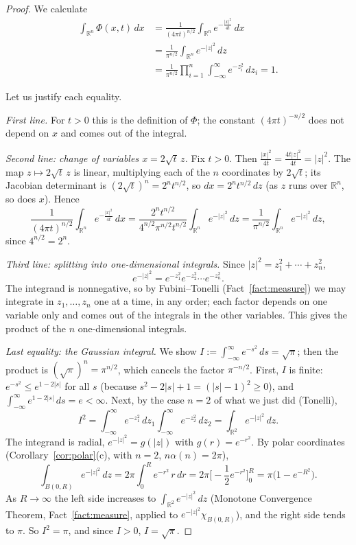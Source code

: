 \documentclass[11pt]{article}
\theoremstyle{plain}
\theoremstyle{definition}
\theoremstyle{remark}
\begin{document}
\begin{proof}
We calculate
\begin{align*}
\int_{\mathbb{R}^n}\Phi(x,t)\, dx &= \frac{1}{(4\pi t)^{n/2}}\int_{\mathbb{R}^n} e^{-\frac{|x|^2}{4t}}\, dx \\
&= \frac{1}{\pi^{n/2}}\int_{\mathbb{R}^n} e^{-|z|^2}\, dz \\
&= \frac{1}{\pi^{n/2}}\prod_{i=1}^n\int_{-\infty}^\infty e^{-z_i^2}\, dz_i = 1.
\end{align*}

Let us justify each equality.

\emph{First line.} For $t > 0$ this is the definition of $\Phi$; the constant $(4\pi t)^{-n/2}$ does not depend on $x$ and comes out of the integral.

\emph{Second line: change of variables $x = 2\sqrt t\, z$.} Fix $t > 0$. Then $\frac{|x|^2}{4t} = \frac{4t|z|^2}{4t} = |z|^2$. The map $z \mapsto 2\sqrt t\, z$ is linear, multiplying each of the $n$ coordinates by $2\sqrt t$; its Jacobian determinant is $(2\sqrt t)^n = 2^n t^{n/2}$, so $dx = 2^n t^{n/2}\, dz$ (as $z$ runs over $\mathbb{R}^n$, so does $x$). Hence
$$ \frac{1}{(4\pi t)^{n/2}}\int_{\mathbb{R}^n} e^{-\frac{|x|^2}{4t}}\, dx = \frac{2^n t^{n/2}}{4^{n/2}\pi^{n/2}t^{n/2}}\int_{\mathbb{R}^n} e^{-|z|^2}\, dz = \frac{1}{\pi^{n/2}}\int_{\mathbb{R}^n} e^{-|z|^2}\, dz, $$
since $4^{n/2} = 2^n$.

\emph{Third line: splitting into one-dimensional integrals.} Since $|z|^2 = z_1^2 + \cdots + z_n^2$,
$$ e^{-|z|^2} = e^{-z_1^2}e^{-z_2^2}\cdots e^{-z_n^2}. $$
The integrand is nonnegative, so by Fubini--Tonelli (Fact~\ref{fact:measure}) we may integrate in $z_1, \dots, z_n$ one at a time, in any order; each factor depends on one variable only and comes out of the integrals in the other variables. This gives the product of the $n$ one-dimensional integrals.

\emph{Last equality: the Gaussian integral.} We show $I := \int_{-\infty}^\infty e^{-s^2}\, ds = \sqrt\pi$; then the product is $(\sqrt\pi)^n = \pi^{n/2}$, which cancels the factor $\pi^{-n/2}$. First, $I$ is finite: $e^{-s^2} \le e^{1-2|s|}$ for all $s$ (because $s^2 - 2|s| + 1 = (|s|-1)^2 \geq 0$), and $\int_{-\infty}^\infty e^{1-2|s|}\, ds = e < \infty$. Next, by the case $n = 2$ of what we just did (Tonelli),
$$ I^2 = \int_{-\infty}^\infty e^{-z_1^2}\, dz_1\int_{-\infty}^\infty e^{-z_2^2}\, dz_2 = \int_{\mathbb{R}^2} e^{-|z|^2}\, dz. $$
The integrand is radial, $e^{-|z|^2} = g(|z|)$ with $g(r) = e^{-r^2}$. By polar coordinates (Corollary~\ref{cor:polar}(c), with $n = 2$, $n\alpha(n) = 2\pi$),
$$ \int_{B(0,R)} e^{-|z|^2}\, dz = 2\pi\int_0^R e^{-r^2}\, r\, dr = 2\pi\Big[-\frac12 e^{-r^2}\Big]_0^R = \pi\big(1 - e^{-R^2}\big). $$
As $R \to \infty$ the left side increases to $\int_{\mathbb{R}^2} e^{-|z|^2}\, dz$ (Monotone Convergence Theorem, Fact~\ref{fact:measure}, applied to $e^{-|z|^2}\chi_{B(0,R)}$), and the right side tends to $\pi$. So $I^2 = \pi$, and since $I > 0$, $I = \sqrt\pi$.
\end{proof}
\end{document}
